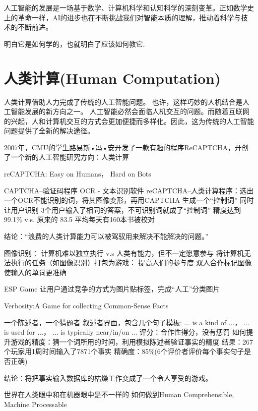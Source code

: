 人工智能的发展是一场基于数学、计算机科学和认知科学的深刻变革。正如数学史上的革命一样，AI的进步也在不断挑战我们对智能本质的理解，推动着科学与技术的不断前进。

明白它是如何学的，也就明白了应该如何教它.

\section{人类计算(Human Computation)}
人类计算借助人力完成了传统的人工智能问题。
 也许，这样巧妙的人机结合是人工智能发展的新方向之一。
人工智能必然会面临人机交互的问题。而随着互联网的兴起，人和计算机交互的方式会更加便捷而多样化。因此，这为传统的人工智能问题提供了全新的解决途径。

 2007年，CMU的学生路易斯•冯•安开发了一款有趣的程序ReCAPTCHA，开创了一个新的人工智能研究方向：人类计算

reCAPTCHA: Easy on Humans， Hard on Bots

 CAPTCHA–验证码程序
 OCR - 文本识别软件 
 reCAPTCHA–人类计算程序：选出一个OCR不能识别的词，将其图像变形，再用CAPTCHA 生成一个“控制词” 同时让用户识别 
 3个用户输入了相同的答案，不可识别词就成了“控制词” 
 精度达到99.1\% v.s. 原来的 83.5%
 平均每天有160本书被校对 

结论：“浪费的人类计算能力可以被驾驭用来解决不能解决的问题。”

图像识别：
       计算机难以独立执行  v.s   人类有能力，但不一定愿意参与
将计算机无法执行的任务（如图像识别）打包为游戏：
提高人们的参与度
双人合作标记图像使输入的单词更准确

ESP Game
让用户通过竞争的方式为图片贴标签，完成“人工”分类图片

Verbosity:A Game for collecting Common-Sense Facts

 一个陈述者，一个猜题者 
 叙述者界面，包含几个句子模板:
... is a kind of ...， 
... is used for ...， 
... is typically near/in/on ... 
 评分：合作性得分，没有惩罚 
 如何提升游戏的精度：猜一个词所用的时间，利用模拟陈述者验证事实的精度 
 结果：267个玩家用1周时间输入了7871个事实 
 精确度：85\%(6个评价者评价每个事实句子是否正确) 

结论：将把事实输入数据库的枯燥工作变成了一个令人享受的游戏。

% 
% 


世界在人类眼中和在机器眼中是不一样的 
如何做到Human Comprehensible, Machine Processable

